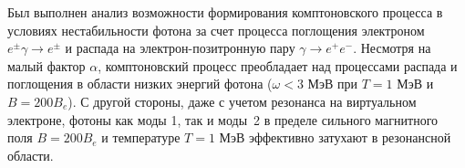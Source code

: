 Был выполнен анализ возможности формирования комптоновского процесса в условиях 
нестабильности фотона за счет процесса поглощения электроном $e^\pm\gamma\to 
e^\pm$ и распада на электрон-позитронную пару $\gamma\to e^+e^-$. Несмотря на 
малый фактор $\alpha$, комптоновский процесс преобладает над процессами распада 
и поглощения в области низких энергий фотона ($\omega<3$ МэВ при $T=1$ МэВ и $B 
=200B_e$). С другой стороны, даже с учетом резонанса на виртуальном электроне, 
фотоны как моды 1, так и моды~2 в пределе сильного магнитного поля $B=200 B_e$ 
и температуре $T=1$ МэВ эффективно затухают в резонансной области.
